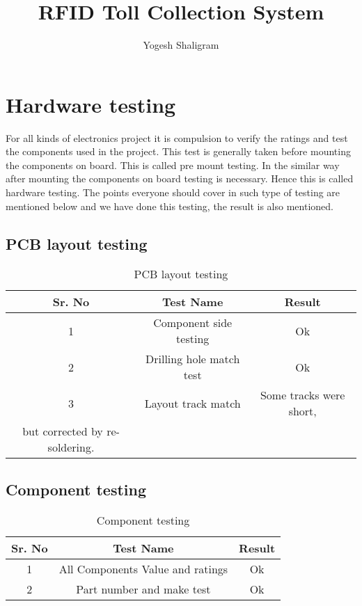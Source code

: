 \documentclass[12pt,Times]{report}
\title{RFID Toll Collection System}
\author{Yogesh Shaligram}
\begin{document}
\maketitle





\section{Hardware testing}
For all kinds of electronics project it is compulsion to verify the ratings and test the components used in the project. This test is generally taken before mounting the components on board. This is called pre mount testing. In the similar way after mounting the components on board testing is necessary. Hence this is called hardware testing. The points everyone should cover in such type of testing are mentioned below and we have done this testing, the result is also mentioned.
\subsection{PCB layout testing}
\begin{table}[htbp]
	\caption{PCB layout testing}
	\label{tab:PCB layout testing}
	 \begin{tabular}{|c|c|c|} 
 \hline
 \textbf{Sr. No} &\textbf{Test Name} & \textbf{Result}\\ [0.5ex] 
 \hline
1& Component side testing& Ok\\
\hline
2&Drilling hole match test& Ok\\
\hline
3&Layout track match&Some tracks were short,\\ but corrected by re-soldering.
\hline
\end{tabular}	 
\end{table}
\subsection{Component testing}
\begin{table}[htbp]
	\caption{Component testing}
	\label{tab:Component testing}
	 \begin{tabular}{|c|c|c|} 
 \hline
 \textbf{Sr. No} &\textbf{Test Name} & \textbf{Result}\\ [0.5ex] 
 \hline
1& All Components Value and ratings& Ok\\
\hline
2&Part number and make test& Ok\\
\hline
\end{tabular}	 
\end{table}
\newpage
\end{document}
